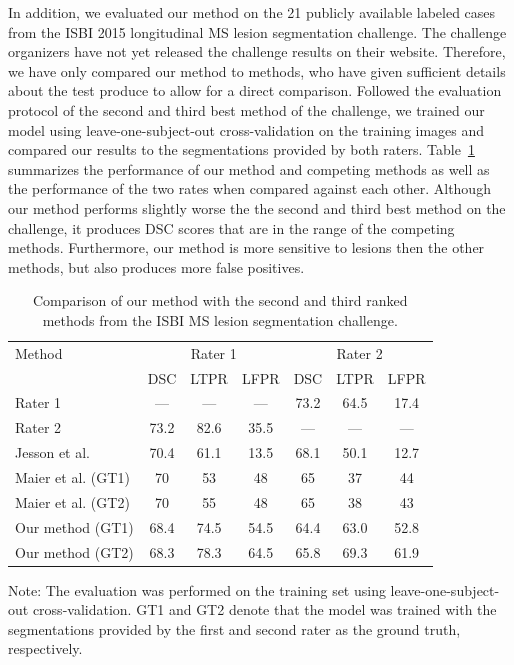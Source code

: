 In addition, we evaluated our method on the 21 publicly available labeled cases
from the ISBI 2015 longitudinal MS lesion segmentation challenge. The challenge
organizers have not yet released the challenge results on their website.
Therefore, we have only compared our method to methods, who have given
sufficient details about the test produce to allow for a direct comparison.
Followed the evaluation protocol of the second and third best method of the
challenge, we trained our model using leave-one-subject-out cross-validation on
the training images and compared our results to the segmentations provided by
both raters. Table~\ref{tab:isbi} summarizes the performance of our method
and competing methods as well as the performance of the two rates when compared
against each other. Although our method performs slightly worse the the second
and third best method on the challenge, it produces DSC scores that are in the
range of the competing methods. Furthermore, our method is more sensitive to
lesions then the other methods, but also produces more false positives.

\begin{table}
\caption{Comparison of our method with the second and third ranked methods from
the ISBI MS lesion segmentation challenge.}
\label{tab:isbi}
\begin{center}
\begin{tabular}{@{}lcccccc@{}}
\toprule
Method &
\multicolumn{3}{c}{Rater 1} &
\multicolumn{3}{c}{Rater 2} \\
& DSC & LTPR & LFPR & DSC & LTPR & LFPR \\
\midrule
Rater 1 & --- & --- & --- & 73.2 & 64.5 & 17.4 \\
Rater 2 & 73.2 & 82.6 & 35.5 & --- & --- & --- \\
Jesson et al. &  70.4 & 61.1 & 13.5 & 68.1 & 50.1 & 12.7 \\
Maier et al. (GT1) & 70 & 53 & 48 & 65 & 37 & 44 \\
Maier et al. (GT2) & 70 & 55 & 48 & 65 & 38 & 43 \\
Our method (GT1) & 68.4 & 74.5 & 54.5 & 64.4 & 63.0 & 52.8 \\
Our method (GT2) & 68.3 & 78.3 & 64.5 & 65.8 & 69.3 & 61.9 \\
\bottomrule
\end{tabular}
\end{center}
Note: The evaluation was performed on the training set using
leave-one-subject-out cross-validation. GT1 and GT2 denote that the model was
trained with the segmentations provided by the first and second rater as the
ground truth, respectively.
\end{table}

